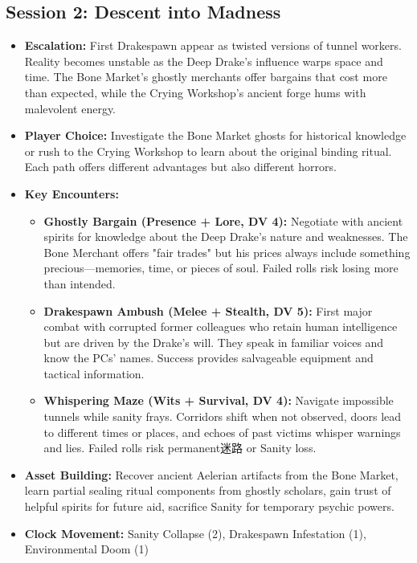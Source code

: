 \documentclass[11pt]{article}
\begin{document}
\subsection{Session 2: Descent into Madness}
\begin{itemize}
\item \textbf{Escalation:} First Drakespawn appear as twisted versions of tunnel workers. Reality becomes unstable as the Deep Drake's influence warps space and time. The Bone Market's ghostly merchants offer bargains that cost more than expected, while the Crying Workshop's ancient forge hums with malevolent energy.
\item \textbf{Player Choice:} Investigate the Bone Market ghosts for historical knowledge or rush to the Crying Workshop to learn about the original binding ritual. Each path offers different advantages but also different horrors.
\item \textbf{Key Encounters:}
  \begin{itemize}
  \item \textbf{Ghostly Bargain (Presence + Lore, DV 4):} Negotiate with ancient spirits for knowledge about the Deep Drake's nature and weaknesses. The Bone Merchant offers "fair trades" but his prices always include something precious—memories, time, or pieces of soul. Failed rolls risk losing more than intended.
  \item \textbf{Drakespawn Ambush (Melee + Stealth, DV 5):} First major combat with corrupted former colleagues who retain human intelligence but are driven by the Drake's will. They speak in familiar voices and know the PCs' names. Success provides salvageable equipment and tactical information.
  \item \textbf{Whispering Maze (Wits + Survival, DV 4):} Navigate impossible tunnels while sanity frays. Corridors shift when not observed, doors lead to different times or places, and echoes of past victims whisper warnings and lies. Failed rolls risk permanent迷路 or Sanity loss.
  \end{itemize}
\item \textbf{Asset Building:} Recover ancient Aelerian artifacts from the Bone Market, learn partial sealing ritual components from ghostly scholars, gain trust of helpful spirits for future aid, sacrifice Sanity for temporary psychic powers.
\item \textbf{Clock Movement:} Sanity Collapse (2), Drakespawn Infestation (1), Environmental Doom (1)
\end{itemize}
\end{document}

